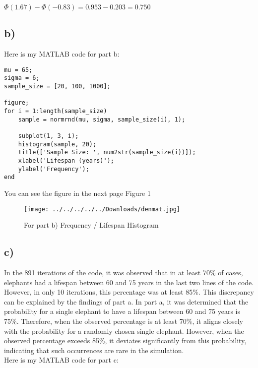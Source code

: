 \documentclass[12pt]{article}
\begin{document}
\(\Phi(1.67) - \Phi(-0.83)  = 0.953 - 0.203 = 0.750\)

\subsection*{b)} 
Here is my MATLAB code for part b:\\
\begin{verbatim}
mu = 65;
sigma = 6;
sample_size = [20, 100, 1000];

figure;
for i = 1:length(sample_size)
    sample = normrnd(mu, sigma, sample_size(i), 1);
    
    subplot(1, 3, i);
    histogram(sample, 20);
    title(['Sample Size: ', num2str(sample_size(i))]);
    xlabel('Lifespan (years)');
    ylabel('Frequency');
end
\end{verbatim}

You can see the figure in the next page Figure 1
\begin{figure}[htbp]
    \centering
    \hspace{-2.5cm}\texttt{[image: ../../../../../Downloads/denmat.jpg]}
    \caption{For part b) Frequency / Lifespan Histogram}
    \label{fig:your_image}
\end{figure}

\subsection*{c)} 

 In the 891 iterations of the code, it was observed that in at least 70\% of cases, elephants had a lifespan between 60 and 75 years in the last two lines of the code. However, in only 10 iterations, this percentage was at least 85\%. This discrepancy can be explained by the findings of part a. In part a, it was determined that the probability for a single elephant to have a lifespan between 60 and 75 years is 75\%. Therefore, when the observed percentage is at least 70\%, it aligns closely with the probability for a randomly chosen single elephant. However, when the observed percentage exceeds 85\%, it deviates significantly from this probability, indicating that such occurrences are rare in the simulation.\\

Here is my MATLAB code for part c:\\
\end{document}

